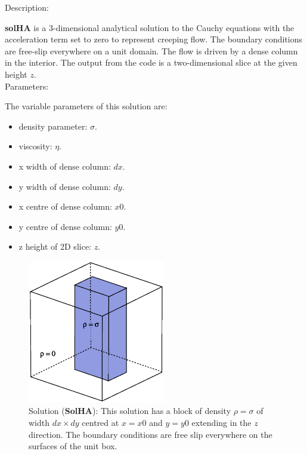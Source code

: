   {\large \fontB Description:}
  
  {\bf solHA} is a 3-dimensional analytical solution to the Cauchy equations with the acceleration term set to zero
  to represent creeping flow. The boundary conditions are free-slip everywhere on a unit domain. 
  The flow is driven by a dense column in the interior. The output from the code is a two-dimensional slice
  at the given height  $z$.
  \\

  {\large \fontB Parameters:}
 
  The variable parameters of this solution are:
  \begin{itemize}
    \item{density parameter: $ \sigma $.}
    \item{viscosity: $\eta$.}
    \item{x width of dense column: $dx$.}
    \item{y width of dense column: $dy$.}
    \item{x centre of dense column: $x0$.}
    \item{y centre of dense column: $y0$.}
    \item{z height of 2D slice: $z$.}
    \end{itemize}

  \begin{figure}
    \includegraphics[width=6cm,clip]{../figs/figHA.eps}
    \caption[Short caption]{\label{figHA} 
      Solution ({\bf SolHA}):
      This solution has a block of density $\rho = \sigma$
      of width $dx \times dy$ centred at $x=x0$ and $y=y0$    
       extending in the $z$ direction.
      The boundary conditions are free slip everywhere on the surfaces of the unit box.}
  \end{figure} 
  

